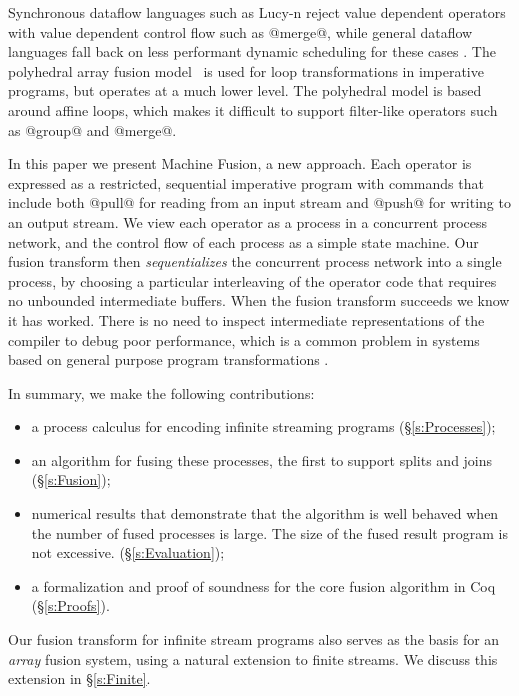 Synchronous dataflow languages such as Lucy-n \cite{mandel2010lucy} reject value dependent operators with value dependent control flow such as @merge@, while general dataflow languages fall back on less performant dynamic scheduling for these cases \cite{bouakaz2013real}.
The polyhedral array fusion model~\cite{feautrier2011polyhedron} is used for loop transformations in imperative programs, but operates at a much lower level. The polyhedral model is based around affine loops, which makes it difficult to support filter-like operators such as @group@ and @merge@.

In this paper we present Machine Fusion, a new approach. Each operator is expressed as a restricted, sequential imperative program with commands that include both @pull@ for reading from an input stream and @push@ for writing to an output stream. We view each operator as a process in a concurrent process network, and the control flow of each process as a simple state machine. Our fusion transform then \emph{sequentializes} the concurrent process network into a single process, by choosing a particular interleaving of the operator code that requires no unbounded intermediate buffers. When the fusion transform succeeds we know it has worked. There is no need to inspect intermediate representations of the compiler to debug poor performance, which is a common problem in systems based on general purpose program transformations \cite{lippmeier2012guiding}.

In summary, we make the following contributions:
\begin{itemize}
\item a process calculus for encoding infinite streaming programs (\S\ref{s:Processes});
\item an algorithm for fusing these processes, the first to support splits and joins (\S\ref{s:Fusion});
\item numerical results that demonstrate that the algorithm is well behaved when the number of fused processes is large. The size of the fused result program is not excessive. (\S\ref{s:Evaluation});
\item a formalization and proof of soundness for the core fusion algorithm in Coq (\S\ref{s:Proofs}).
\end{itemize}

Our fusion transform for infinite stream programs also serves as the basis for an \emph{array} fusion system, using a natural extension to finite streams. We discuss this extension in \S\ref{s:Finite}.

